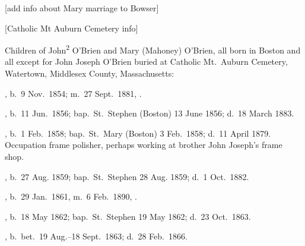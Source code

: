 [add info about Mary marriage to Bowser]

[Catholic Mt Auburn Cemetery info]

\begin{KidsIntro}
	Children of John\textsuperscript{2} O'Brien and Mary (Mahoney) O'Brien, all born in Boston and all except for John Joseph O'Brien buried at Catholic Mt.\ Auburn Cemetery, Watertown, Middlesex County, Massachusetts:\cite{BillMcEvoy}
\end{KidsIntro}

\begin{Kids}
	, b.\ 9 Nov.\ 1854; m.\ 27 Sept.\ 1881, .
	
	, b.\ 11 Jun.\ 1856;\cite{Mary3OBrienBirth} bap.\ St.\ Stephen (Boston) 13 June 1856;\cite{Mary3OBrienBaptism} d.\ 18 March 1883.\cite{Mary3OBrienDeath}
	
	, b.\ 1 Feb.\ 1858;\cite{James3OBrienBirth} bap.\ St.\ Mary (Boston) 3 Feb.\ 1858;\cite{James3OBrienBaptism} d.\ 11 April 1879. Occupation frame polisher,\cite{James3OBrienDeath} perhaps working at brother John Joseph's frame shop.
	
	, b.\ 27 Aug. 1859;\cite{Ellen3OBrienBaptism} bap.\ St.\ Stephen 28 Aug. 1859;\cite{Ellen3OBrienBaptism} d.\ 1 Oct.\ 1882.\cite{Ellen3OBrienDeath}
	
	, b.\ 29 Jan.\ 1861, m.\ 6 Feb.\ 1890, .
	
	, b.\ 18 May 1862;\cite{Margaret3OBrienBaptism} bap.\ St.\ Stephen 19 May 1862;\cite{Margaret3OBrienBaptism} d.\ 23 Oct.\ 1863.\cite{Margaret3OBrienDeath}
	
	, b.\ bet.\ 19 Aug.--18 Sept.\ 1863;\cite{Anna3OBrienDeath} d.\ 28 Feb.\ 1866.\cite{Anna3OBrienDeath}
	
\end{Kids}